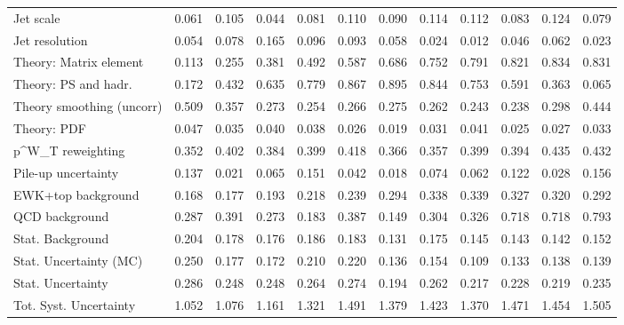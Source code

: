 \begin{tabular}{l|p{0.6cm}p{0.6cm}p{0.6cm}p{0.6cm}p{0.6cm}p{0.6cm}p{0.6cm}p{0.6cm}p{0.6cm}p{0.6cm}p{0.6cm}}
Jet scale                                & 0.061 & 0.105 & 0.044 & 0.081 & 0.110 & 0.090 & 0.114 & 0.112 & 0.083 & 0.124 & 0.079 \\
Jet resolution                           & 0.054 & 0.078 & 0.165 & 0.096 & 0.093 & 0.058 & 0.024 & 0.012 & 0.046 & 0.062 & 0.023 \\
Theory: Matrix element                   & 0.113 & 0.255 & 0.381 & 0.492 & 0.587 & 0.686 & 0.752 & 0.791 & 0.821 & 0.834 & 0.831 \\
Theory: PS and hadr.                     & 0.172 & 0.432 & 0.635 & 0.779 & 0.867 & 0.895 & 0.844 & 0.753 & 0.591 & 0.363 & 0.065 \\
Theory smoothing (uncorr)                & 0.509 & 0.357 & 0.273 & 0.254 & 0.266 & 0.275 & 0.262 & 0.243 & 0.238 & 0.298 & 0.444 \\
Theory: PDF                              & 0.047 & 0.035 & 0.040 & 0.038 & 0.026 & 0.019 & 0.031 & 0.041 & 0.025 & 0.027 & 0.033 \\
p^{W}_{T} reweighting                    & 0.352 & 0.402 & 0.384 & 0.399 & 0.418 & 0.366 & 0.357 & 0.399 & 0.394 & 0.435 & 0.432 \\
Pile-up uncertainty                      & 0.137 & 0.021 & 0.065 & 0.151 & 0.042 & 0.018 & 0.074 & 0.062 & 0.122 & 0.028 & 0.156 \\
EWK+top background                       & 0.168 & 0.177 & 0.193 & 0.218 & 0.239 & 0.294 & 0.338 & 0.339 & 0.327 & 0.320 & 0.292 \\
QCD background                           & 0.287 & 0.391 & 0.273 & 0.183 & 0.387 & 0.149 & 0.304 & 0.326 & 0.718 & 0.718 & 0.793 \\
Stat. Background                         & 0.204 & 0.178 & 0.176 & 0.186 & 0.183 & 0.131 & 0.175 & 0.145 & 0.143 & 0.142 & 0.152 \\
Stat. Uncertainty (MC)                   & 0.250 & 0.177 & 0.172 & 0.210 & 0.220 & 0.136 & 0.154 & 0.109 & 0.133 & 0.138 & 0.139 \\
\hline
Stat. Uncertainty                        & 0.286 & 0.248 & 0.248 & 0.264 & 0.274 & 0.194 & 0.262 & 0.217 & 0.228 & 0.219 & 0.235 \\
\hline
Tot. Syst. Uncertainty                   & 1.052 & 1.076 & 1.161 & 1.321 & 1.491 & 1.379 & 1.423 & 1.370 & 1.471 & 1.454 & 1.505 \\
\hline
\end{tabular}
